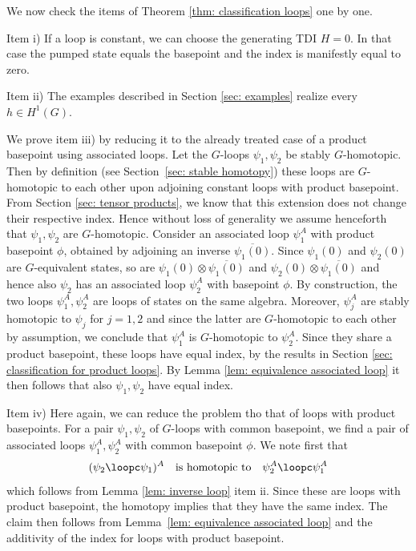 We now check the items of Theorem \ref{thm: classification loops} one by one.

Item i) If a loop is constant, we can choose the generating TDI $H=0$. In that case the pumped state equals the basepoint and the index is manifestly equal to zero.

Item ii)  The examples described in Section \ref{sec: examples} realize every $h\in H^1(G)$.

We prove item iii) by reducing it to the already treated case of a product basepoint using associated loops. Let the $G$-loops $\psi_1,\psi_2$ be stably $G$-homotopic. Then by definition (see Section~\ref{sec: stable homotopy})  these loops are $G$-homotopic to each other upon adjoining constant loops with product basepoint. From Section \ref{sec: tensor products}, we know that this extension does not change their respective index. Hence without loss of generality we assume henceforth that $\psi_1,\psi_2$ are $G$-homotopic. 
Consider an associated loop $\psi_1^{A}$ with product basepoint $\phi$, obtained by adjoining an inverse $\overline{\psi_1(0)}$. Since $\psi_1(0)$ and $\psi_2(0)$ are $G$-equivalent states, so are $\psi_1(0) \otimes \overline{\psi_1(0)}$ and $\psi_2(0)\otimes \overline{\psi_1(0)}$ and hence also $\psi_2$ has an associated loop $ \psi_2^A$ with basepoint $\phi$. By construction, the two loops $\psi_1^A,\psi_2^A$ are loops of states on the same algebra. Moreover, $\psi_j^A$ are stably homotopic to $\psi_j$ for $j=1,2$ and since the latter are $G$-homotopic to each other by assumption, we conclude that $\psi_1^A$ is $G$-homotopic to $\psi_2^A$.  Since they share a product basepoint, these loops have equal index, by the results in Section \ref{sec: classification for product loops}.  By Lemma \ref{lem: equivalence associated loop}  it then follows that also $\psi_1,\psi_2$ have equal index.

Item iv) Here again, we can reduce the problem tho that of loops with product basepoints. For a pair $\psi_1,\psi_2$ of $G$-loops with common basepoint, we find a pair of associated loops $\psi^A_1,\psi^A_2$ with common basepoint $\phi$. 
We note first that
$$
(\psi_2\loopc\psi_1)^A \quad \text{is homotopic to}\quad  \psi^A_2\loopc\psi^A_1
$$
which follows from Lemma \ref{lem: inverse loop} item ii.  Since these are loops with product basepoint, the homotopy implies that they have the same index. The claim then follows from Lemma~\ref{lem: equivalence associated loop} and the additivity of the index for loops with product basepoint.

